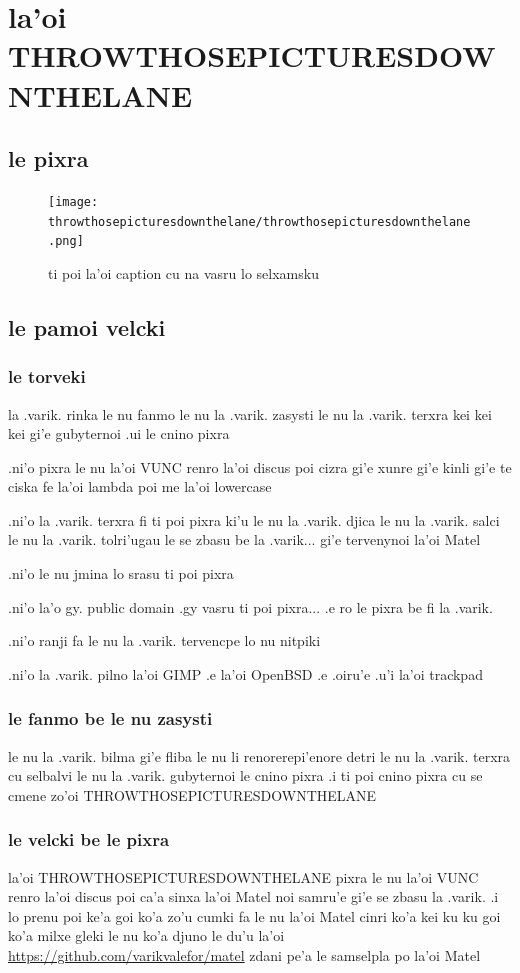 \documentclass{report}
\begin{document}
\chapter{la'oi THROWTHOSEPICTURESDOWNTHELANE}
\section{le pixra}
\begin{figure}[ht]
	\centering
	\texttt{[image: throwthosepicturesdownthelane/throwthosepicturesdownthelane.png]}
	\caption[center]{ti poi la'oi caption cu na vasru lo selxamsku}
\end{figure}
\section{le pamoi velcki}
\subsection{le torveki}
la .varik. rinka le nu fanmo le nu la .varik. zasysti le nu la .varik. terxra kei kei kei gi'e gubyternoi .ui le cnino pixra

.ni'o pixra le nu la'oi VUNC renro la'oi discus poi cizra gi'e xunre gi'e kinli gi'e te ciska fe la'oi lambda poi me la'oi lowercase

.ni'o la .varik. terxra fi ti poi pixra ki'u le nu la .varik. djica le nu la .varik. salci le nu la .varik. tolri'ugau le se zbasu be la .varik... gi'e tervenynoi la'oi Matel

.ni'o le nu jmina lo srasu ti poi pixra

.ni'o la'o gy. public domain .gy vasru ti poi pixra... .e ro le pixra be fi la .varik.

.ni'o ranji fa le nu la .varik. tervencpe lo nu nitpiki

.ni'o la .varik. pilno la'oi GIMP .e la'oi OpenBSD .e .oiru'e .u'i la'oi trackpad

\subsection{le fanmo be le nu zasysti}
le nu la .varik. bilma gi'e fliba le nu li renorerepi'enore detri le nu la .varik. terxra cu selbalvi le nu la .varik. gubyternoi le cnino pixra  .i ti poi cnino pixra cu se cmene zo'oi THROWTHOSEPICTURESDOWNTHELANE

\subsection{le velcki be le pixra}
la'oi THROWTHOSEPICTURESDOWNTHELANE pixra le nu la'oi VUNC renro la'oi discus poi ca'a sinxa la'oi Matel noi samru'e gi'e se zbasu la .varik.  .i lo prenu poi ke'a goi ko'a zo'u cumki fa le nu la'oi Matel cinri ko'a kei ku ku goi ko'a milxe gleki le nu ko'a djuno le du'u la'oi \url{https://github.com/varikvalefor/matel} zdani pe'a le samselpla po la'oi Matel
\end{document}
